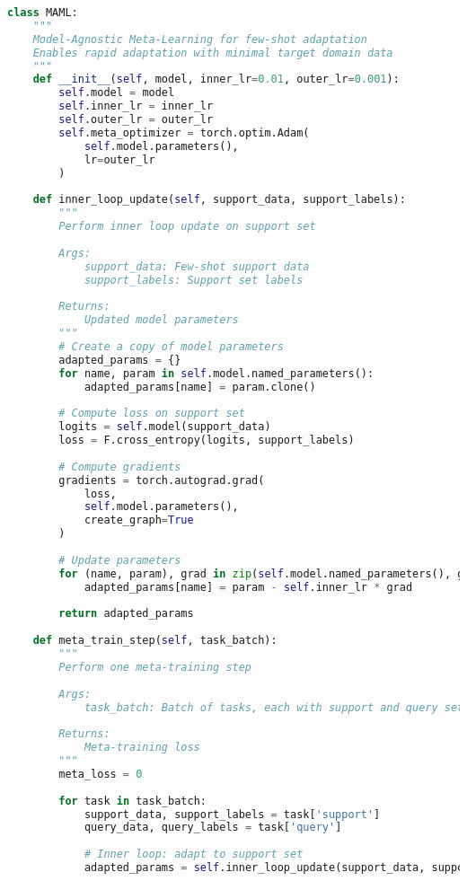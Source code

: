 \documentclass[journal]{IEEEtran}
\begin{document}
\begin{lstlisting}[language=Python, caption=MAML Implementation for Few-Shot Learning]
class MAML:
    """
    Model-Agnostic Meta-Learning for few-shot adaptation
    Enables rapid adaptation with minimal target domain data
    """
    def __init__(self, model, inner_lr=0.01, outer_lr=0.001):
        self.model = model
        self.inner_lr = inner_lr
        self.outer_lr = outer_lr
        self.meta_optimizer = torch.optim.Adam(
            self.model.parameters(), 
            lr=outer_lr
        )
        
    def inner_loop_update(self, support_data, support_labels):
        """
        Perform inner loop update on support set
        
        Args:
            support_data: Few-shot support data
            support_labels: Support set labels
        
        Returns:
            Updated model parameters
        """
        # Create a copy of model parameters
        adapted_params = {}
        for name, param in self.model.named_parameters():
            adapted_params[name] = param.clone()
        
        # Compute loss on support set
        logits = self.model(support_data)
        loss = F.cross_entropy(logits, support_labels)
        
        # Compute gradients
        gradients = torch.autograd.grad(
            loss, 
            self.model.parameters(),
            create_graph=True
        )
        
        # Update parameters
        for (name, param), grad in zip(self.model.named_parameters(), gradients):
            adapted_params[name] = param - self.inner_lr * grad
        
        return adapted_params
    
    def meta_train_step(self, task_batch):
        """
        Perform one meta-training step
        
        Args:
            task_batch: Batch of tasks, each with support and query sets
        
        Returns:
            Meta-training loss
        """
        meta_loss = 0
        
        for task in task_batch:
            support_data, support_labels = task['support']
            query_data, query_labels = task['query']
            
            # Inner loop: adapt to support set
            adapted_params = self.inner_loop_update(support_data, support_labels)
            

\end{lstlisting}
\end{document}
